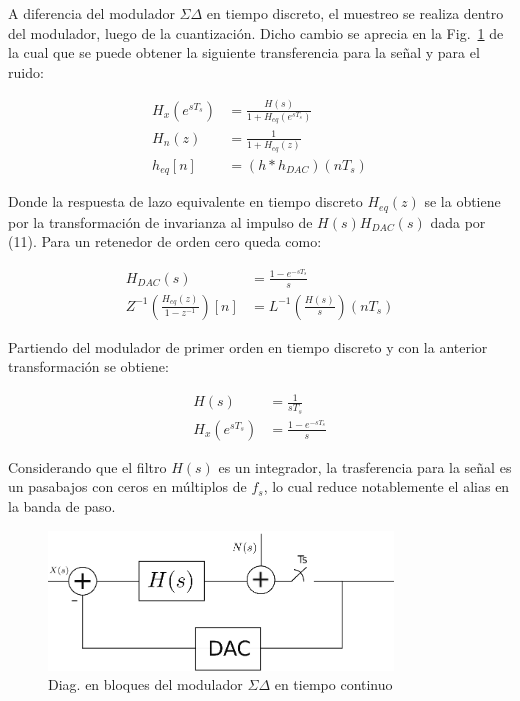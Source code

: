 \documentclass[a4paper,conference]{IEEEtran}
\begin{document}
A diferencia del modulador $\Sigma\Delta$ en tiempo discreto, el muestreo se realiza dentro del modulador, luego de la cuantización. Dicho cambio se aprecia en la Fig.~\ref{fig:SDTC} de la cual que se puede obtener la siguiente transferencia para la señal y para el ruido:


\begin{align}
H_x(e^{sT_s}) &= \frac{H(s)}{1+H_{eq}(e^{sT_s})} \\
H_n(z) &= \frac{1}{1+H_{eq}(z)} \\
h_{eq}[n] &= (h\ast h_{DAC})(nT_s)
\end{align}

Donde la respuesta de lazo equivalente en tiempo discreto $H_{eq}(z)$ se la obtiene por la transformaci\'on de invarianza al impulso\cite{DSP:Pro-Man} de $H(s)H_{DAC}(s)$ dada por (11). Para un retenedor de orden cero queda como:

\begin{align}
 H_{DAC}(s)&=\frac{1-e^{-sT_s}}{s}\\
 Z^{-1}(\frac{H_{eq}(z)}{1-z^{-1}})[n]&=L^{-1}(\frac{H(s)}{s})(nT_s)
\end{align}

Partiendo del modulador de primer orden en tiempo discreto y con la anterior transformaci\'on se obtiene:

\begin{align}
 H(s)&=\frac{1}{sT_s}\\
 H_x(e^{sT_s})&= \frac{1-e^{-sT_s}}{s}
\end{align}

Considerando que el filtro $H(s)$ es un integrador, la trasferencia para la se\~nal es un pasabajos con ceros en múltiplos de $f_s$, lo cual reduce notablemente el alias en la banda de paso.

\begin{figure}[!t]
\centering
\includegraphics[width=3.6in]{Sigma-Delta_Tiempo_Continuo}
\caption{Diag. en bloques del modulador $\Sigma\Delta$ en tiempo continuo}
\label{fig:SDTC}
\end{figure}
\end{document}
